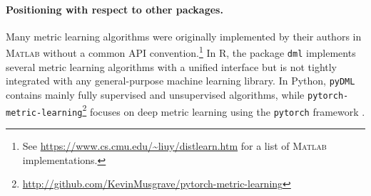 \documentclass[twoside,11pt]{article}
\newcommand{\aurelien}[1]{\todo[inline,caption={},color=orange!40]{{\it Aurelien:~}#1}}
\newcommand{\MATLAB}{\textsc{Matlab}\xspace}
\begin{document}
\paragraph{Positioning with respect to other packages.} Many metric learning algorithms were originally implemented by their authors in \MATLAB without a common API convention.\footnote{See \url{https://www.cs.cmu.edu/~liuy/distlearn.htm} for a list of \MATLAB implementations.}  In R, the package \texttt{dml} \citep{Tang18} implements several metric learning algorithms with a unified interface but is not tightly integrated with any general-purpose machine learning library. In Python, \texttt{pyDML} \citep{pyDML} contains mainly fully supervised and unsupervised algorithms, while \texttt{pytorch-metric-learning}\footnote{\url{http://github.com/KevinMusgrave/pytorch-metric-learning}} focuses on deep metric learning using the \texttt{pytorch} framework \citep{pytorch}.


\end{document}
